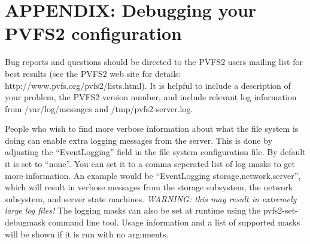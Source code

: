 \documentclass[11pt, letterpaper]{article}
\begin{document}
\section{APPENDIX: Debugging your PVFS2 configuration}

Bug reports and questions should be directed to the PVFS2 users mailing list
for best results (see the PVFS2 web site for details:
http://www.pvfs.org/pvfs2/lists.html).  It is helpful to
include a description of your problem, the PVFS2 version number, and include
relevant log information from /var/log/messages and /tmp/pvfs2-server.log. 

People who wish to find more verbose information about what the file
system is doing can enable extra logging messages from the server.
This is done by adjusting the ``EventLogging'' field in the file system
configuration file.  By default it is set to ``none''.  You can set it to
a comma seperated list of log masks to get more information.  An example
would be ``EventLogging storage,network,server'', which will result
in verbose messages from the storage subsystem, the network subsystem,
and server state machines.  \emph{WARNING: this may result in extremely
large log files!}  The logging masks can also be set at runtime using the
pvfs2-set-debugmask command line tool.  Usage information and a list of
supported masks will be shown if it is run with no arguments.
\end{document}
